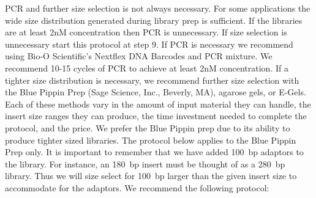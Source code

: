 \documentclass[graybox]{svmult}
\begin{document}
PCR and further size selection is not always necessary. For some applications the wide size distribution generated during library prep is sufficient. If the libraries are at least 2nM concentration then PCR is unnecessary. If size selection is unnecessary start this protocol at step 9. If PCR is necessary we recommend using Bio-O Scientific’s Nextflex DNA Barcodes and PCR mixture.  We recommend 10-15 cycles of PCR to achieve at least 2nM concentration. If a tighter size distribution is necessary, we recommend further size selection with the Blue Pippin Prep (Sage Science, Inc., Beverly, MA), agarose gels, or E-Gels.  Each of these methods vary in the amount of input material they can handle, the insert size ranges they can produce, the time investment needed to complete the protocol, and the price. We prefer the Blue Pippin prep due to its ability to produce tighter sized libraries. The protocol below applies to the Blue Pippin Prep only. It is important to remember that we have added 100~bp adaptors to the library.  For instance, an 180~bp insert must be thought of as a 280~bp library. Thus we will size select for 100~bp larger than the given insert size to accommodate for the adaptors.
We recommend the following protocol:
\end{document}
